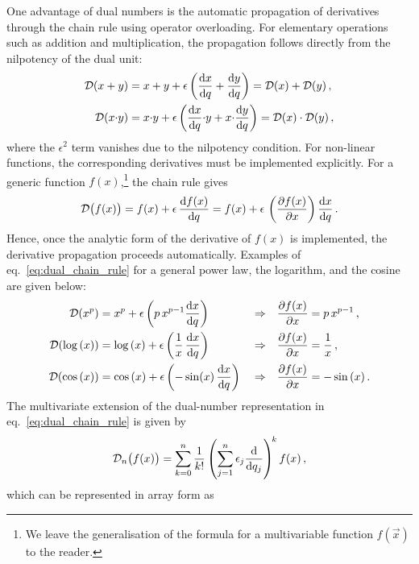 One advantage of dual numbers is the automatic propagation of derivatives through the chain rule using operator overloading. For elementary operations such as addition and multiplication, the propagation follows directly from the nilpotency of the dual unit:
\begin{align}
    {\cal D}(x + y) & = x + y + \epsilon \left( \frac{\mathrm{d} x}{\mathrm{d} q} + \frac{\mathrm{d} y}{\mathrm{d} q} \right)={\cal D}(x)+{\cal D}(y)\, , \\
    {\cal D}(x{\cdot}y) & = x{\cdot}y + \epsilon \left( \frac{\mathrm{d} x}{\mathrm{d} q}{\cdot}y + x{\cdot}\frac{\mathrm{d} y}{\mathrm{d} q} \right)={\cal D}(x)\cdot{\cal D}(y)\,,
\end{align}
where the $\epsilon^2$ term vanishes due to the nilpotency condition. For non-linear functions, the corresponding derivatives must be implemented explicitly. For a generic function $f(x)$,\footnote{We leave the generalisation of the formula for a multivariable function $f(\vec{x})$ to the reader.} the chain rule gives 
\begin{equation}
    {\cal D}\big( f(x) \big) = f(x) + \epsilon\,  \frac{\mathrm{d} f(x)}{\mathrm{d} q} = f(x) + \epsilon\, \left( \frac{\partial f(x)}{\partial x}\right)\frac{\mathrm{d} x}{\mathrm{d} q}\,.
\label{eq:dual_chain_rule}
\end{equation}
Hence, once the analytic form of the derivative of $f(x)$ is implemented, the derivative propagation proceeds automatically.
Examples of eq.~\eqref{eq:dual_chain_rule} for a general power law, the logarithm, and the cosine are given below:
\begin{align}
    {\cal D}(x^p) & = x^p + \epsilon \left( p\, x^{p-1}\frac{\mathrm{d} x}{\mathrm{d} q} \right) && \Rightarrow && \frac{\partial f(x)}{\partial x} = p\, x^{p-1}\,, \nonumber\\
    {\cal D}(\log{(x)}) & = \log{(x)} + \epsilon \left( \frac{1}{x}\,\frac{\mathrm{d} x}{\mathrm{d} q} \right) && \Rightarrow && \frac{\partial f(x)}{\partial x} = \frac{1}{x}\,, \nonumber\\
    {\cal D}(\cos{(x)}) & = \cos{(x)} + \epsilon \left( -\sin(x)\,\frac{\mathrm{d} x}{\mathrm{d} q} \right) && \Rightarrow && \frac{\partial f(x)}{\partial x} =  -\sin{(x)}\,.\nonumber
\end{align}
The multivariate extension of the dual-number representation in eq.~\eqref{eq:dual_chain_rule} is given by
\begin{align}
    {\cal D}_n\big(f(x)\big) = \sum_{k=0}^n \frac{1}{k!} \left( \sum_{j=1}^n \epsilon_j \frac{\mathrm{d}}{\mathrm{d} q_j} \right)^{\!k} f(x) \,,
\label{eq:mulvar_dual_chain}
\end{align}
which can be represented in array form as
